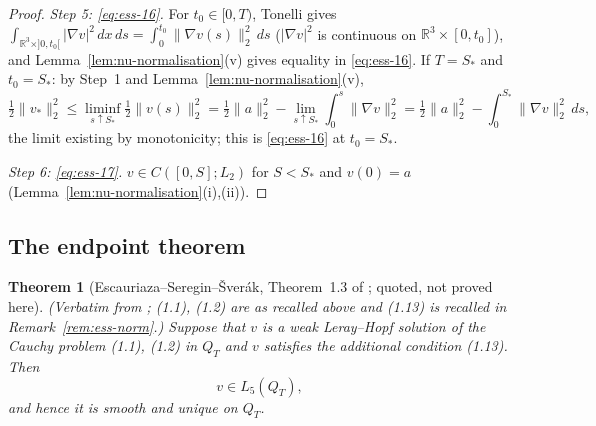 \documentclass[11pt]{article}
\newtheorem{theorem}{Theorem}[section]
\theoremstyle{definition}
\theoremstyle{plain}
\newcommand{\R}{\mathbb R}
\newcommand{\norm}[1]{\lVert #1\rVert}
\begin{document}
\begin{proof}
\emph{Step 5: \eqref{eq:ess-16}.}  For $t_0\in[0,T)$, Tonelli gives
$\int_{\R^3\times]0,t_0[}|\nabla v|^2\,dx\,ds=\int_0^{t_0}\norm{\nabla v(s)}_2^2\,ds$
($|\nabla v|^2$ is continuous on $\R^3\times[0,t_0]$), and
Lemma~\ref{lem:nu-normalisation}(v) gives equality in \eqref{eq:ess-16}.
If $T=S_*$ and $t_0=S_*$: by Step~1 and Lemma~\ref{lem:nu-normalisation}(v),
\[
 \tfrac12\norm{v_*}_2^2\leq\liminf_{s\uparrow S_*}\tfrac12\norm{v(s)}_2^2
 =\tfrac12\norm a_2^2-\lim_{s\uparrow S_*}\int_0^s\norm{\nabla v}_2^2
 =\tfrac12\norm a_2^2-\int_0^{S_*}\norm{\nabla v}_2^2\,ds ,
\]
the limit existing by monotonicity; this is \eqref{eq:ess-16} at $t_0=S_*$.

\emph{Step 6: \eqref{eq:ess-17}.}  $v\in C([0,S];L_2)$ for $S<S_*$ and
$v(0)=a$ (Lemma~\ref{lem:nu-normalisation}(i),(ii)).
\end{proof}

\subsection{The endpoint theorem}

\begin{theorem}[Escauriaza--Seregin--\v Sver\'ak, Theorem~1.3 of \cite{ESS2003};
quoted, not proved here]\label{thm:ess}
\textup{(Verbatim from \cite[p.~214]{ESS2003}; (1.1), (1.2) are as recalled
above and (1.13) is recalled in Remark~\ref{rem:ess-norm}.)}
Suppose that $v$ is a weak Leray--Hopf solution of the Cauchy problem (1.1),
(1.2) in $Q_T$ and $v$ satisfies the additional condition (1.13).  Then
\[
 v\in L_5(Q_T),
\]
and hence it is smooth and unique on $Q_T$.
\end{theorem}
\end{document}
